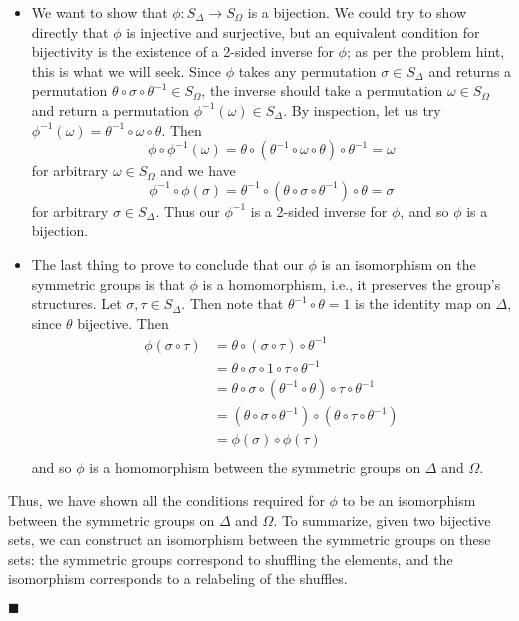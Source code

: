 \documentclass[12pt]{article}
\renewcommand{\qed}{\hfill$\blacksquare$}
\renewenvironment{proof}{\begin{addmargin}[1em]{0em}\begin{newproof}}{\end{newproof}\end{addmargin}\qed}
\begin{document}
\begin{proof}
\begin{itemize}
    \item We want to show that $\phi:S_{\Delta}\rightarrow S_{\Omega}$ is a bijection. We could try to show directly that $\phi$ is injective and surjective, but an equivalent condition for bijectivity is the existence of a 2-sided inverse for $\phi$; as per the problem hint, this is what we will seek. Since $\phi$ takes any permutation $\sigma \in S_{\Delta}$ and returns a permutation $\theta \circ \sigma \circ \theta^{-1}\in S_{\Omega}$, the inverse should take a permutation $\omega \in S_{\Omega}$ and return a permutation $\phi^{-1}\left(\omega\right) \in S_{\Delta}$. By inspection, let us try $\phi^{-1}\left(\omega\right) = \theta^{-1}\circ \omega \circ \theta$. Then
    $$ \phi\circ \phi^{-1}\left(\omega\right) = \theta \circ \left( \theta^{-1}\circ \omega \circ \theta \right)\circ \theta^{-1} = \omega $$ for arbitrary $\omega \in S_{\Omega}$ and we have
    $$ \phi^{-1}\circ \phi\left(\sigma\right) = \theta^{-1} \circ \left( \theta \circ \sigma \circ \theta^{-1}\right)\circ \theta = \sigma$$ for arbitrary $\sigma \in S_{\Delta}$. Thus our $\phi^{-1}$ is a 2-sided inverse for $\phi$, and so $\phi$ is a bijection.

    \item The last thing to prove to conclude that our $\phi$ is an isomorphism on the symmetric groups is that $\phi$ is a homomorphism, i.e., it preserves the group's structures. Let $\sigma,\tau \in S_{\Delta}$. Then note that $\theta^{-1}\circ \theta = 1$ is the identity map on $\Delta$, since $\theta$ bijective. Then
    \begin{equation*}
        \begin{split}
            \phi \left(\sigma \circ \tau\right) & = \theta \circ \left(\sigma \circ \tau \right)\circ \theta^{-1} \\
            & = \theta \circ \sigma \circ 1 \circ \tau \circ \theta^{-1} \\
            & = \theta \circ \sigma \circ \left(\theta^{-1} \circ \theta \right)\circ \tau \circ \theta^{-1} \\
            & = \left(\theta \circ \sigma \circ \theta^{-1}\right)\circ \left(\theta \circ \tau \circ \theta^{-1}\right) \\
            & = \phi\left(\sigma\right)\circ \phi\left(\tau\right) \\
        \end{split}
    \end{equation*}
    and so $\phi$ is a homomorphism between the symmetric groups on $\Delta$ and $\Omega$.
\end{itemize}
Thus, we have shown all the conditions required for $\phi$ to be an isomorphism between the symmetric groups on $\Delta$ and $\Omega$. To summarize, given two bijective sets, we can construct an isomorphism between the symmetric groups on these sets: the symmetric groups correspond to shuffling the elements, and the isomorphism corresponds to a relabeling of the shuffles.
\end{proof}
\end{document}
